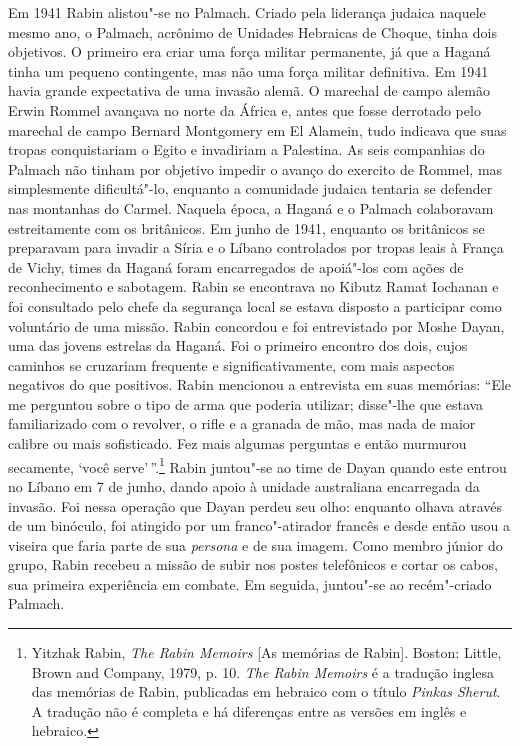 Em 1941 Rabin alistou"-se no Palmach. Criado pela liderança judaica 
naquele mesmo ano, o Palmach, acrônimo de Unidades Hebraicas de Choque, tinha
dois objetivos. O primeiro era criar uma força militar permanente, já que a
Haganá tinha um pequeno contingente, mas não uma força militar
definitiva. Em 1941 havia grande expectativa de uma invasão alemã. O
marechal de campo alemão Erwin Rommel avançava no norte da África e,
antes que fosse derrotado pelo marechal de campo Bernard Montgomery em
El Alamein, tudo indicava que suas tropas conquistariam o Egito e
invadiriam a Palestina. As seis companhias do Palmach não tinham por
objetivo impedir o avanço do exercito de Rommel, mas simplesmente
dificultá"-lo, enquanto a comunidade judaica tentaria se defender nas
montanhas do Carmel. Naquela época, a Haganá e o Palmach colaboravam
estreitamente com os britânicos. Em junho de 1941, enquanto os
britânicos se preparavam para invadir a Síria e o Líbano controlados por
tropas leais à França de Vichy, times da Haganá foram encarregados de
apoiá"-los com ações de reconhecimento e sabotagem. Rabin se encontrava
no Kibutz Ramat Iochanan e foi consultado pelo chefe da segurança local
se estava disposto a participar como voluntário de uma missão. Rabin
concordou e foi entrevistado por Moshe Dayan, uma das jovens estrelas da
Haganá. Foi o primeiro encontro dos dois, cujos caminhos se cruzariam
frequente e significativamente, com mais aspectos negativos do que
positivos. Rabin mencionou a entrevista em suas memórias: ``Ele me
perguntou sobre o tipo de arma que poderia utilizar; disse"-lhe que
estava familiarizado com o revolver, o rifle e a granada de mão, mas
nada de maior calibre ou mais sofisticado. Fez mais algumas perguntas e
então murmurou secamente, `você serve'\,''.\footnote{Yitzhak Rabin, 
\textit{The Rabin Memoirs} {[}As memórias de Rabin{]}. Boston: Little, Brown and Company, 1979, p. 10.
\textit{The Rabin Memoirs} é a tradução inglesa das memórias de Rabin, publicadas em hebraico com o título
\textit{Pinkas Sherut}. A tradução não é
completa e há diferenças entre as versões em inglês e hebraico.} Rabin juntou"-se ao
time de Dayan quando este entrou no Líbano em 7 de junho, dando apoio à
unidade australiana encarregada da invasão. Foi nessa operação que Dayan
perdeu seu olho: enquanto olhava através de um binóculo, foi atingido
por um franco"-atirador francês e desde então usou a viseira que faria
parte de sua \textit{persona} e de sua imagem. Como membro júnior do grupo,
Rabin recebeu a missão de subir nos postes telefônicos e cortar os
cabos, sua primeira experiência em combate. Em seguida, juntou"-se ao
recém"-criado Palmach.

